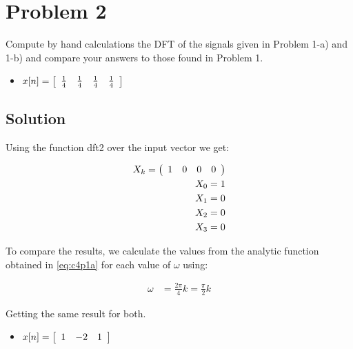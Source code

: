 \section*{Problem 2}

Compute by hand calculations the DFT of the signals given in Problem 1-a) 
and 1-b) and compare your answers to those found in Problem 1.

\begin{itemize}
\item 
$x[n] =
\left[
\begin{array}{c c c c}
 \frac{1}{4}&  \frac{1}{4}& \frac{1}{4}& \frac{1}{4}
 \end{array}
 \right]
$
\end{itemize} 


\subsection*{Solution}

Using the function dft2 over the input vector we get:

\begin{equation*}
\begin{aligned}
X_k = \left(
 \begin{array}{c c c c}
 1 & 0 & 0 & 0
 \end{array}
 \right) \\
X_0 = 1 \\
X_1 = 0 \\
X_2 = 0 \\
X_3 = 0 
\end{aligned}
\end{equation*} 

To compare the results, we calculate the values from the analytic function obtained
in \ref{eq:c4p1a} for each value of $\omega$ using:

\begin{equation*}
\begin{aligned}
\omega &= \frac{2 \pi}{4} k = \frac{\pi}{2} k 
\end{aligned}
\end{equation*} 


Getting the same result for both.

\begin{itemize}
\item 
$x[n] =
\left[ \begin{array}{c c c}
1 & -2 & 1
\end{array} \right] $
\end{itemize} 

